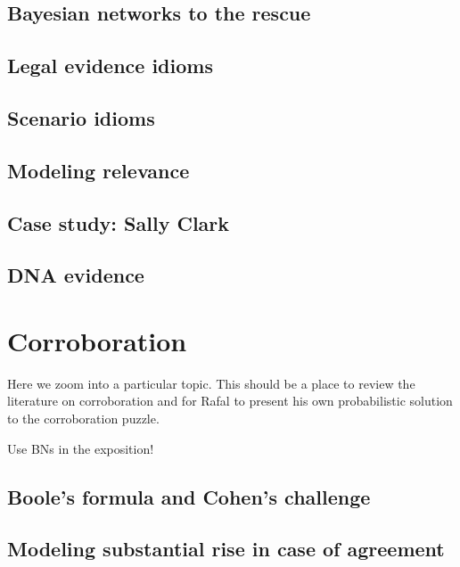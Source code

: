 \documentclass[]{book}
\begin{document}
\section{Bayesian networks to the rescue}

\section{Legal evidence idioms}

\section{Scenario idioms}

\section{Modeling relevance}

\section{Case study: Sally Clark}


\section{DNA evidence}


\chapter{Corroboration}

Here we zoom into a particular topic. This should be a place to review
the literature on corroboration and for Rafal to present his own
probabilistic solution to the corroboration puzzle.

Use BNs in the exposition!

\section{Boole's formula and Cohen's challenge}

\section{Modeling substantial rise in case of agreement}
\end{document}
